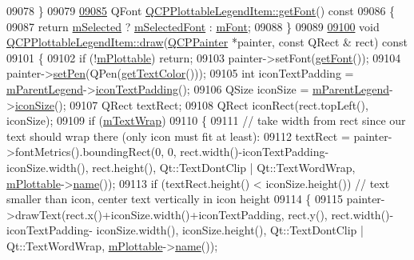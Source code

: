 \begin{DoxyCode}
09078 \}
09079 
\hypertarget{a00115_source_l09085}{}\hyperlink{a00048_a8a85c8a25affb4895423d730164d61de}{09085} QFont \hyperlink{a00048_a8a85c8a25affb4895423d730164d61de}{QCPPlottableLegendItem::getFont}()\textcolor{keyword}{ const}
09086 \textcolor{keyword}{}\{
09087   \textcolor{keywordflow}{return} \hyperlink{a00023_ae58ebebbd0c36cc6fe897483369984d2}{mSelected} ? \hyperlink{a00023_ab971df604306b192875a7d097feb1e21}{mSelectedFont} : \hyperlink{a00023_ae916a78ac0d2a60e20a17ca2f24f9754}{mFont};
09088 \}
09089 
\hypertarget{a00115_source_l09100}{}\hyperlink{a00048_ad5f15d26b1c7e2532455528a4c3c578b}{09100} \textcolor{keywordtype}{void} \hyperlink{a00048_ad5f15d26b1c7e2532455528a4c3c578b}{QCPPlottableLegendItem::draw}(\hyperlink{a00047}{QCPPainter} *painter, \textcolor{keyword}{const} QRect &
      rect)\textcolor{keyword}{ const}
09101 \textcolor{keyword}{}\{
09102   \textcolor{keywordflow}{if} (!\hyperlink{a00048_ada647fb4b22971a1a424e15b4f6af0d9}{mPlottable}) \textcolor{keywordflow}{return};
09103   painter->setFont(\hyperlink{a00048_a8a85c8a25affb4895423d730164d61de}{getFont}());
09104   painter->\hyperlink{a00047_af9c7a4cd1791403901f8c5b82a150195}{setPen}(QPen(\hyperlink{a00048_ad762b07439c738660ba93e78c1d03667}{getTextColor}()));
09105   \textcolor{keywordtype}{int} iconTextPadding = \hyperlink{a00023_aafcd9fc6fcb10f4a8d46037011afafe8}{mParentLegend}->\hyperlink{a00045_a9d6d07042a284c4ba5f9e3cb5c9281ef}{iconTextPadding}();
09106   QSize iconSize = \hyperlink{a00023_aafcd9fc6fcb10f4a8d46037011afafe8}{mParentLegend}->\hyperlink{a00045_a27dfb770b14adc0e8811bef8129780a5}{iconSize}();
09107   QRect textRect;
09108   QRect iconRect(rect.topLeft(), iconSize);
09109   \textcolor{keywordflow}{if} (\hyperlink{a00048_a074d2372cb8954d30ff8ad533462ce96}{mTextWrap})
09110   \{
09111     \textcolor{comment}{// take width from rect since our text should wrap there (only icon must fit at least):}
09112     textRect = painter->fontMetrics().boundingRect(0, 0, rect.width()-iconTextPadding-iconSize.width(), 
      rect.height(), Qt::TextDontClip | Qt::TextWordWrap, \hyperlink{a00048_ada647fb4b22971a1a424e15b4f6af0d9}{mPlottable}->\hyperlink{a00024_a1affc1972938e4364a9325e4e4e4dcea}{name}());
09113     \textcolor{keywordflow}{if} (textRect.height() < iconSize.height()) \textcolor{comment}{// text smaller than icon, center text vertically in icon
       height}
09114     \{
09115       painter->drawText(rect.x()+iconSize.width()+iconTextPadding, rect.y(), rect.width()-iconTextPadding-
      iconSize.width(), iconSize.height(), Qt::TextDontClip | Qt::TextWordWrap, 
      \hyperlink{a00048_ada647fb4b22971a1a424e15b4f6af0d9}{mPlottable}->\hyperlink{a00024_a1affc1972938e4364a9325e4e4e4dcea}{name}());

\end{DoxyCode}
